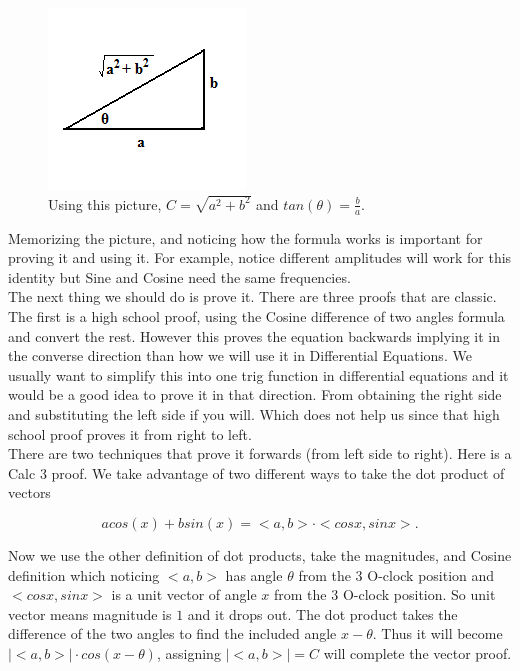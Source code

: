 \documentclass[12pt]{article}
\begin{document}
\begin{figure}[ht]
\centering
\includegraphics[scale=.8]{trigidentitypicture.png}
\caption{Using this picture, $C=\sqrt{a^2+b^2}$ and $tan(\theta)=\frac{b}{a}$.}
\label{fig:}
\end{figure}

Memorizing the picture, and noticing how the formula works is important for proving it and using it. For example, notice different amplitudes will work for this identity but Sine and Cosine need the same frequencies. \\

The next thing we should do is prove it. There are three proofs that are classic. The first is a high school proof, using the Cosine difference of two angles formula and convert the rest. However this proves the equation backwards implying it in the converse direction than how we will use it in Differential Equations. We usually want to simplify this into one trig function in differential equations and it would be a good idea to prove it in that direction. From obtaining the right side and substituting the left side if you will. Which does not help us since that high school proof proves it from right to left. \\

There are two techniques that prove it forwards (from left side to right). Here is a Calc 3 proof. We take advantage of two different ways to take the dot product of vectors 

\begin{equation*}
    acos(x)+bsin(x)=<a,b>\cdot<cosx,sinx> .
\end{equation*} 

Now we use the other definition of dot products, take the magnitudes, and Cosine definition which noticing $<a,b>$ has angle $\theta$ from the 3 O-clock position and $<cosx,sinx>$ is a unit vector of angle $x$ from the 3 O-clock position. So unit vector means magnitude is $1$ and it drops out. The dot product takes the difference of the two angles to find the included angle $x-\theta$. Thus it will become $|<a,b>| \cdot cos(x-\theta)$, assigning $|<a,b>|=C$ will complete the vector proof. \\
\end{document}
